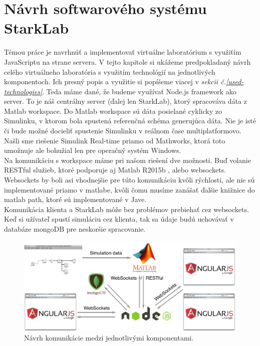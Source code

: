 \section{Návrh softwarového systému StarkLab}
\indent Témou práce je navrhnúť a implementovať virtuálne laboratórium s využiťím JavaScriptu na strane servera. V tejto kapitole si ukážeme predpokladaný návrh celého virtuálneho laboratória s využitím technológií na jednotlivých komponentoch. Ich presný popis a využitie si popíšeme viacej v \textit{sekcii č.\ref{used-technologies}}. Teda máme dané, že budeme využívať Node.js framework ako server. To je náš centrálny server (ďalej len StarkLab), ktorý spracováva dáta z Matlab workspace. Do Matlab workspace sú dáta posielané cyklicky zo Simulinku, v ktorom bola spustená referenčná schéma generujúca dáta. Nie je isté či bude možné docieliť spustenie Simulinku v reálnom čase multiplatformovo. Našli sme riešenie Simulink Real-time priamo od Mathworks, ktorá toto umožnuje ale bohužial len pre operačný systém Windows.\\
Na komunikáciu s workspace máme pri našom riešení dve možnosti. Buď volanie RESTful služieb, ktoré podporuje aj Matlab R2015b \cite{matlab-restful}, alebo websockets. Websockets by boli asi vhodnejšie pre túto komunikáciu kvôli rýchlosti, ale nie sú implementované priamo v matlabe, kvôli čomu musíme zanášať ďalšie knižnice do matlab path, ktoré sú implementované v Jave.\\
Komunikácia klienta a StarkLab môže bez problémov prebiehať cez websockets. Keď si užívateľ spustí simuláciu cez klienta, tak sa údaje budú uchovávať v databáze mongoDB pre neskoršie spracovanie.

\begin{figure}[H]
  \centering
  \includegraphics[scale=0.4]{img/software-design.png}
  \caption{Návrh komunikácie medzi jednotlivými komponentami.}
  \label{img-software-designl}
\end{figure}


